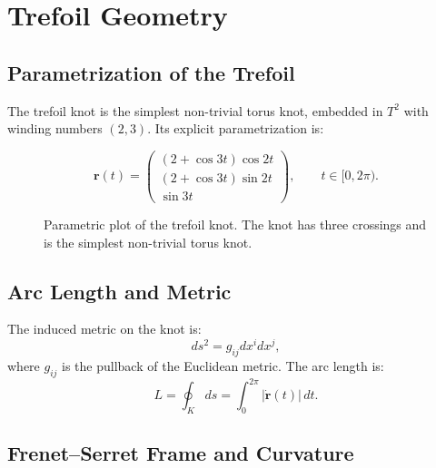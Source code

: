\documentclass[12pt,oneside]{book}
\begin{document}
\chapter{Trefoil Geometry}

\section{Parametrization of the Trefoil}

The trefoil knot is the simplest non-trivial torus knot, embedded in $T^2$ with winding numbers $(2,3)$. Its explicit parametrization is:

\[
\mathbf{r}(t) =
\begin{pmatrix}
(2+\cos 3t)\cos 2t \\
(2+\cos 3t)\sin 2t \\
\sin 3t
\end{pmatrix}, \qquad t \in [0,2\pi).
\]

\begin{figure}[H]
\centering
{}
\caption{Parametric plot of the trefoil knot. The knot has three crossings and is the simplest non-trivial torus knot.}
\label{fig:trefoil}
\end{figure}

\section{Arc Length and Metric}

The induced metric on the knot is:
\[
ds^2 = g_{ij} dx^i dx^j,
\]
where $g_{ij}$ is the pullback of the Euclidean metric. The arc length is:
\[
L = \oint_K ds = \int_0^{2\pi} |\dot{\mathbf{r}}(t)| \, dt.
\]

\section{Frenet--Serret Frame and Curvature}
\end{document}
